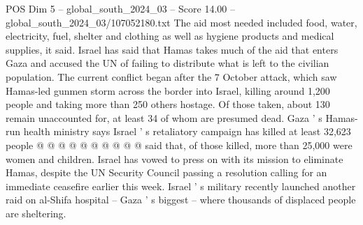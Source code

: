 \begin{textsample}{POS Dim 5 – global\_south\_2024\_03 – Score 14.00 – global\_south\_2024\_03/107052180.txt}
The aid most needed included food, water, electricity, fuel, shelter and clothing as well as hygiene products and medical supplies, it said.
Israel has said that Hamas takes much of the aid that enters Gaza and accused the UN of failing to distribute what is left to the civilian population.
The current conflict began after the 7 October attack, which saw Hamas-led gunmen storm across the border into Israel, killing around 1,200 people and taking more than 250 others hostage.
Of those taken, about 130 remain unaccounted for, at least 34 of whom are presumed dead.
Gaza ' s Hamas-run health ministry says Israel ' s retaliatory campaign has killed at least 32,623 people @ @ @ @ @ @ @ @ @ @ said that, of those killed, more than 25,000 were women and children.
Israel has vowed to press on with its mission to eliminate Hamas, despite the UN Security Council passing a resolution calling for an immediate ceasefire earlier this week.
Israel ' s military recently launched another raid on al-Shifa hospital -- Gaza ' s biggest -- where thousands of displaced people are sheltering.

\end{textsample}
